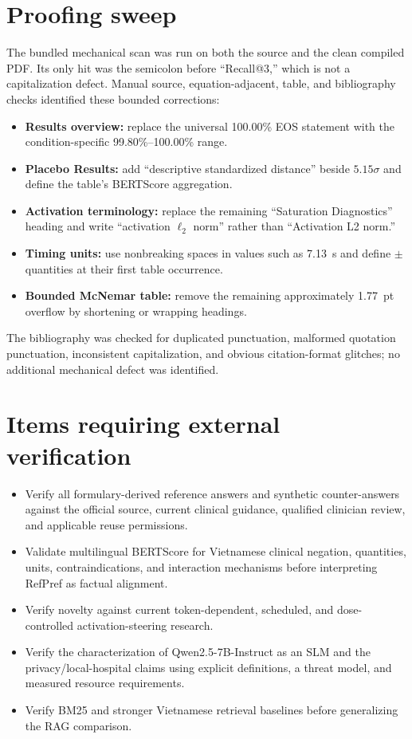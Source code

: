 \documentclass[11pt]{article}
\begin{document}
\section*{Proofing sweep}

The bundled mechanical scan was run on both the source and the clean compiled PDF.  Its only hit was the semicolon before ``Recall@3,'' which is not a capitalization defect.  Manual source, equation-adjacent, table, and bibliography checks identified these bounded corrections:

\begin{itemize}
    \item \textbf{Results overview:} replace the universal 100.00\% EOS statement with the condition-specific 99.80\%--100.00\% range.
    \item \textbf{Placebo Results:} add ``descriptive standardized distance'' beside $5.15\sigma$ and define the table's BERTScore aggregation.
    \item \textbf{Activation terminology:} replace the remaining ``Saturation Diagnostics'' heading and write ``activation $\ell_2$ norm'' rather than ``Activation L2 norm.''
    \item \textbf{Timing units:} use nonbreaking spaces in values such as 7.13~s and define $\pm$ quantities at their first table occurrence.
    \item \textbf{Bounded McNemar table:} remove the remaining approximately 1.77~pt overflow by shortening or wrapping headings.
\end{itemize}

The bibliography was checked for duplicated punctuation, malformed quotation punctuation, inconsistent capitalization, and obvious citation-format glitches; no additional mechanical defect was identified.

\section*{Items requiring external verification}

\begin{itemize}
    \item Verify all formulary-derived reference answers and synthetic counter-answers against the official source, current clinical guidance, qualified clinician review, and applicable reuse permissions.
    \item Validate multilingual BERTScore for Vietnamese clinical negation, quantities, units, contraindications, and interaction mechanisms before interpreting RefPref as factual alignment.
    \item Verify novelty against current token-dependent, scheduled, and dose-controlled activation-steering research.
    \item Verify the characterization of Qwen2.5-7B-Instruct as an SLM and the privacy/local-hospital claims using explicit definitions, a threat model, and measured resource requirements.
    \item Verify BM25 and stronger Vietnamese retrieval baselines before generalizing the RAG comparison.
\end{itemize}
\end{document}
